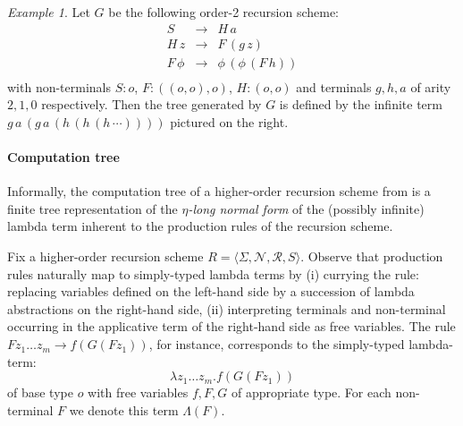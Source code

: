 \documentclass[a4paper,draft]{article}[12pt]
\theoremstyle{remark}
\newtheorem{example}{Example}[section]
\theoremstyle{definition}
\begin{document}
\begin{example}\label{eg:running}
	Let $G$ be the following order-2 recursion scheme:
	\[\begin{array}{rll}
	S & \rightarrow & H \, a\\
	H \, z & \rightarrow & F \, (g \,
	z)\\
	F \, \phi & \rightarrow & \phi \, (\phi \, (F \, h))\\
	\end{array}\]
	with non-terminals $S:o$, $F : ((o, o),o)$, $H:(o,o)$ and terminals $g, h, a$ of arity $2, 1, 0$ respectively.
	Then the tree generated by $G$ is defined by the infinite term
	$g \, a \, (g \, a \, (h \, (h \, (h \,
	\cdots))))$ pictured on the right.%
	
\end{example}

\paragraph{Computation tree}

Informally, the computation tree of a higher-order recursion scheme from \cite{OngLics2006} is a finite tree representation of the \emph{$\eta$-long normal form} of the (possibly infinite) lambda term inherent to the production rules of the recursion scheme.

Fix a higher-order recursion scheme $R = \langle \Sigma, \mathcal{N}, \mathcal{R}, S \rangle$.
Observe that production rules naturally map to simply-typed lambda terms by (i) currying the rule: replacing variables defined on the left-hand side by a succession of lambda abstractions on the right-hand side, (ii) interpreting terminals and non-terminal occurring in the applicative term of the right-hand side as free variables. The rule $F z_1 \ldots z_m \rightarrow f (G (F z_1))$, for instance, corresponds to the simply-typed lambda-term:
$$\lambda z_1 \ldots z_m . f (G (F z_1))$$ of base type $o$ with free variables $f, F, G$ of appropriate type. For each non-terminal $F$ we denote this term $\Lambda(F)$.
\end{document}
